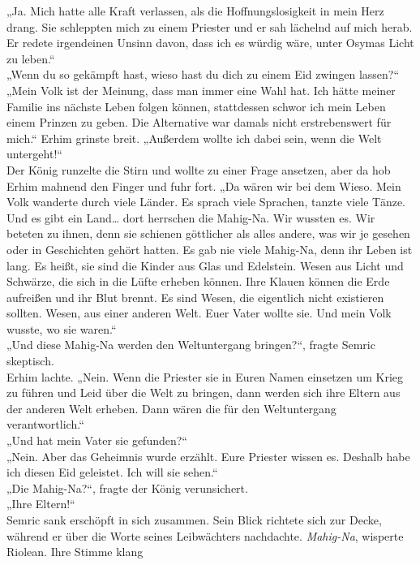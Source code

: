 „Ja. Mich hatte alle Kraft verlassen, als die Hoffnungslosigkeit in mein Herz drang. Sie schleppten 
mich zu einem Priester und er sah lächelnd auf mich herab. Er redete irgendeinen Unsinn davon, dass 
ich es würdig wäre, unter Osymas Licht zu leben.“\\
„Wenn du so gekämpft hast, wieso hast du dich zu einem Eid zwingen lassen?“\\
„Mein Volk ist der Meinung, dass man immer eine Wahl hat. Ich hätte meiner Familie ins nächste Leben 
folgen können, stattdessen schwor ich mein Leben einem Prinzen zu geben. Die Alternative war damals 
nicht erstrebenswert für mich.“ Erhim grinste breit. „Außerdem wollte ich dabei sein, wenn die Welt 
untergeht!“\\
Der König runzelte die Stirn und wollte zu einer Frage ansetzen, aber da hob Erhim mahnend den 
Finger und fuhr fort. „Da wären wir bei dem Wieso. Mein Volk wanderte durch viele Länder. Es sprach 
viele Sprachen, tanzte viele Tänze. Und es gibt ein Land… dort herrschen die Mahig-Na. Wir wussten 
es. Wir beteten zu ihnen, denn sie schienen göttlicher als alles andere, was wir je gesehen oder in 
Geschichten gehört hatten. Es gab nie viele Mahig-Na, denn ihr Leben ist lang. Es heißt, sie sind 
die Kinder aus Glas und Edelstein. Wesen aus Licht und Schwärze, die sich in die Lüfte erheben 
können. Ihre Klauen können die Erde aufreißen und ihr Blut brennt. Es sind Wesen, die eigentlich 
nicht existieren sollten. Wesen, aus einer anderen Welt. Euer Vater wollte sie. Und mein Volk 
wusste, wo sie waren.“\\
„Und diese Mahig-Na werden den Weltuntergang bringen?“, fragte Semric skeptisch.\\
Erhim lachte. „Nein. Wenn die Priester sie in Euren Namen einsetzen um Krieg zu führen und Leid über 
die Welt zu bringen, dann werden sich ihre Eltern aus der anderen Welt erheben. Dann wären die für 
den Weltuntergang verantwortlich.“\\
„Und hat mein Vater sie gefunden?“\\
„Nein. Aber das Geheimnis wurde erzählt. Eure Priester wissen es. Deshalb habe ich diesen Eid 
geleistet. Ich will sie sehen.“\\
„Die Mahig-Na?“, fragte der König verunsichert.\\
„Ihre Eltern!“\\
Semric sank erschöpft in sich zusammen. Sein Blick richtete sich zur Decke, während er über die 
Worte seines Leibwächters nachdachte. \textit{Mahig-Na}, wisperte Riolean. Ihre Stimme klang 
